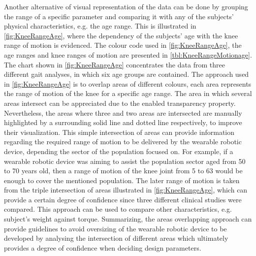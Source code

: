 Another alternative of visual representation of the data can be done by grouping the range of a specific parameter and comparing it with any of the subjects' physical characteristics, e.g. the age range. This is illustrated in \autoref{fig:KneeRangeAge}, where the dependency of the subjects' age with the knee range of motion is evidenced. The colour code used in \autoref{fig:KneeRangeAge}, the age ranges and knee ranges of motion are presented in \autoref{tbl:KneeRangeMotionage}. The chart shown in \autoref{fig:KneeRangeAge} concentrates the data from three different gait analyses, in which six age groups are contained. The approach used in \autoref{fig:KneeRangeAge} is to overlap areas of different colours, each area represents the range of motion of the knee for a specific age range. The area in which several areas intersect can be appreciated due to the enabled transparency property. Nevertheless, the areas where three and two areas are intersected are manually highlighted by a surrounding solid line and dotted line respectively, to improve their visualization. This simple intersection of areas can provide information regarding the required range of motion to be delivered by the wearable robotic device, depending the sector of the population focused on.
For example, if a wearable robotic device was aiming to assist the population sector aged from 50 to 70 years old, then a range of motion of the knee joint from 5 to 63 would be enough to cover the mentioned population. The later range of motion is taken from the triple intersection of areas illustrated in \autoref{fig:KneeRangeAge}, which can provide a certain degree of confidence since three different clinical studies were compared. This approach can be used to compare other characteristics, e.g. subject's weight against torque. Summarizing, the areas overlapping approach can provide guidelines to avoid oversizing of the wearable robotic device to be developed by analysing the intersection of different areas which ultimately provides a degree of confidence when deciding design parameters.

